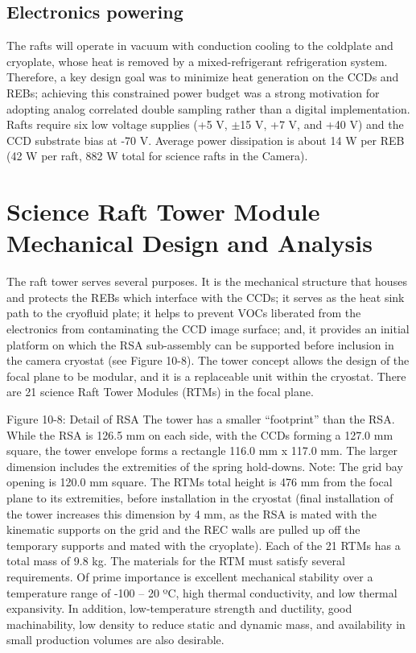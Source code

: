 \subsection{Electronics powering}
The rafts will operate in vacuum with conduction cooling to the coldplate and cryoplate, whose heat is removed by a mixed-refrigerant refrigeration system. Therefore, a key design goal was to minimize heat generation on the CCDs and REBs; achieving this constrained power budget was a strong motivation for adopting analog correlated double sampling rather than a digital implementation. Rafts require six low voltage supplies (+5 V, $\pm$15 V, +7 V, and +40 V) and the CCD substrate bias at -70 V. Average power dissipation is about 14 W per REB (42 W per raft, 882 W total for science rafts in the Camera).

\section{Science Raft Tower Module Mechanical Design and Analysis}

The raft tower serves several purposes. It is the mechanical structure that houses and protects the REBs which interface with the CCDs; it serves as the heat sink path to the cryofluid plate; it helps to prevent VOCs liberated from the electronics from contaminating the CCD image surface; and, it provides an initial platform on which the RSA sub-assembly can be supported before inclusion in the camera cryostat (see Figure 10-8). The tower concept allows the design of the focal plane to be modular, and it is a replaceable unit within the cryostat. There are 21 science Raft Tower Modules (RTMs) in the focal plane.
 
Figure 10-8: Detail of RSA
The tower has a smaller “footprint” than the RSA. While the RSA is 126.5 mm on each side, with the CCDs forming a 127.0 mm square, the tower envelope forms a rectangle 116.0 mm x 117.0 mm. The larger dimension includes the extremities of the spring hold-downs. Note: The grid bay opening is 120.0 mm square. The RTMs total height is 476 mm from the focal plane to its extremities, before installation in the cryostat (final installation of the tower increases this dimension by 4 mm, as the RSA is mated with the kinematic supports on the grid and the REC walls are pulled up off the temporary supports and mated with the cryoplate). Each of the 21 RTMs has a total mass of 9.8 kg.
The materials for the RTM must satisfy several requirements. Of prime importance is excellent mechanical stability over a temperature range of -100 – 20 ºC, high thermal conductivity, and low thermal expansivity. In addition, low-temperature strength and ductility, good machinability, low density to reduce static and dynamic mass, and availability in small production volumes are also desirable.

